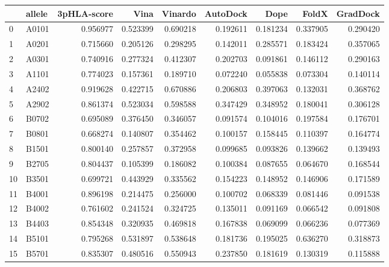 \begin{tabular}{llrrrrrrr}
\toprule
{} & allele &  3pHLA-score &      Vina &   Vinardo &  AutoDock &      Dope &     FoldX &  GradDock \\
\midrule
0  &  A0101 &     0.956977 &  0.523399 &  0.690218 &  0.192611 &  0.181234 &  0.337905 &  0.290420 \\
1  &  A0201 &     0.715660 &  0.205126 &  0.298295 &  0.142011 &  0.285571 &  0.183424 &  0.357065 \\
2  &  A0301 &     0.740916 &  0.277324 &  0.412307 &  0.202703 &  0.091861 &  0.146112 &  0.290163 \\
3  &  A1101 &     0.774023 &  0.157361 &  0.189710 &  0.072240 &  0.055838 &  0.073304 &  0.140114 \\
4  &  A2402 &     0.919628 &  0.422715 &  0.670886 &  0.206803 &  0.397063 &  0.132031 &  0.368762 \\
5  &  A2902 &     0.861374 &  0.523034 &  0.598588 &  0.347429 &  0.348952 &  0.180041 &  0.306128 \\
6  &  B0702 &     0.695089 &  0.376450 &  0.346057 &  0.091574 &  0.104016 &  0.197584 &  0.176701 \\
7  &  B0801 &     0.668274 &  0.140807 &  0.354462 &  0.100157 &  0.158445 &  0.110397 &  0.164774 \\
8  &  B1501 &     0.800140 &  0.257857 &  0.372958 &  0.099685 &  0.093826 &  0.139662 &  0.139493 \\
9  &  B2705 &     0.804437 &  0.105399 &  0.186082 &  0.100384 &  0.087655 &  0.064670 &  0.168544 \\
10 &  B3501 &     0.699721 &  0.443929 &  0.335562 &  0.154223 &  0.148952 &  0.146906 &  0.171589 \\
11 &  B4001 &     0.896198 &  0.214475 &  0.256000 &  0.100702 &  0.068339 &  0.081446 &  0.091538 \\
12 &  B4002 &     0.761602 &  0.241524 &  0.324725 &  0.135011 &  0.091169 &  0.066542 &  0.091808 \\
13 &  B4403 &     0.854348 &  0.320935 &  0.469818 &  0.167838 &  0.069099 &  0.066236 &  0.077369 \\
14 &  B5101 &     0.795268 &  0.531897 &  0.538648 &  0.181736 &  0.195025 &  0.636270 &  0.318873 \\
15 &  B5701 &     0.835307 &  0.480516 &  0.550943 &  0.237850 &  0.181619 &  0.130319 &  0.115888 \\
\bottomrule
\end{tabular}
